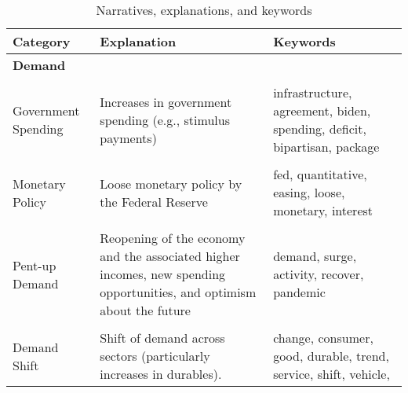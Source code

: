 
\begin{table}
	\caption{Narratives, explanations, and keywords}\label{table:narratives}
	\smallbreak
	\begin{scriptsize}
		\begin{tabular}[htp]{p{3.5cm}|p{5cm}|p{5cm}}		
			\textbf{Category}        & \textbf{Explanation}                                                                                                                                                                            & \textbf{Keywords}                                                                                                                           \\ \toprule 
			\textbf{Demand}          &                                                                                                                                                                                                 &                                                                                                                                             \\ \hline \\[0.02cm]
			Government Spending      & Increases in government spending (e.g., stimulus payments)                                                                                                                                               & infrastructure, agreement, biden, spending, deficit, bipartisan, package                                                                      \\ \\[0.02cm]
			Monetary Policy          & Loose monetary policy by the Federal Reserve                                                                                                                                                   & fed, quantitative, easing, loose, monetary, interest                                                                                        \\ \\[0.02cm]
			Pent-up Demand           & Reopening of the economy and the associated higher incomes, new spending opportunities, and optimism about the future & demand, surge, activity, recover, pandemic \\ \\[0.02cm]
			Demand Shift             & Shift of demand across sectors   (particularly increases in durables). 
			& change, consumer, good, durable, trend, service, shift, vehicle,                                                                                 \\ 

\end{tabular}
\end{scriptsize}
\end{table}
